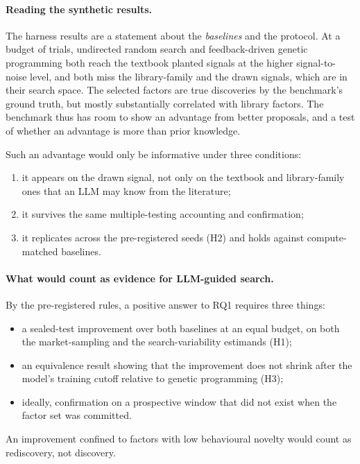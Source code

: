 \paragraph{Reading the synthetic results.} The harness results are a
statement about the \emph{baselines} and the protocol. At a budget of
\SynBudget{} trials, undirected random search and feedback-driven genetic
programming both reach the textbook planted signals at the higher
signal-to-noise level, and both miss the library-family and the drawn
signals, which are in their search space. The selected factors are true
discoveries by the benchmark's ground truth, but mostly substantially
correlated with library factors. The benchmark thus has room to show an advantage from
better proposals, and a test of whether an advantage is more than prior
knowledge.

Such an advantage would only be informative under three conditions:
\begin{enumerate}
  \item it appears on the drawn signal, not only on the textbook and
    library-family ones that an LLM may know from the literature;
  \item it survives the same multiple-testing accounting and confirmation;
  \item it replicates across the pre-registered seeds (H2) and holds against
    compute-matched baselines.
\end{enumerate}

\paragraph{What would count as evidence for LLM-guided search.} By the
pre-registered rules, a positive answer to RQ1 requires three things:
\begin{itemize}
  \item a sealed-test improvement over both baselines at an equal budget, on
    both the market-sampling and the search-variability estimands (H1);
  \item an equivalence result showing that the improvement does not shrink
    after the model's training cutoff relative to genetic programming (H3);
  \item ideally, confirmation on a prospective window that did not exist
    when the factor set was committed.
\end{itemize}
An improvement confined to factors with low behavioural novelty would count
as rediscovery, not discovery. 

